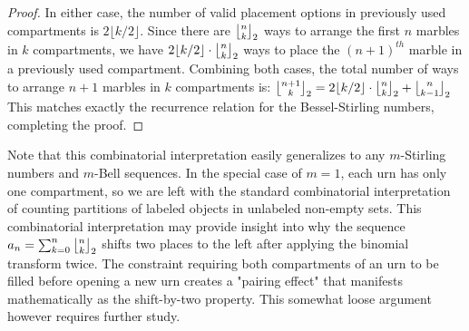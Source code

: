 \documentclass[a4paper]{amsart}
\newcommand{\mStirling}[0]{\genfrac{\lfloor}{\rfloor}{0pt}{}}
\begin{document}
\begin{proof}
In either case, the number of valid placement options in previously used compartments is $2\lfloor k/2 \rfloor$. Since there are $\mStirling{n}{k}_2$ ways to arrange the first $n$ marbles in $k$ compartments, we have $2\lfloor k/2 \rfloor \cdot \mStirling{n}{k}_2$ ways to place the $(n+1)^{th}$ marble in a previously used compartment.
Combining both cases, the total number of ways to arrange $n+1$ marbles in $k$ compartments is:
$\mStirling{n+1}{k}_2 = 2\lfloor k/2 \rfloor \cdot \mStirling{n}{k}_2 + \mStirling{n}{k-1}_2$
This matches exactly the recurrence relation for the Bessel-Stirling numbers, completing the proof.
\end{proof}

Note that this combinatorial interpretation easily generalizes to any $m$-Stirling numbers and $m$-Bell sequences. In the special case of $m=1$, each urn has only one compartment, so we are left with the standard combinatorial interpretation of counting partitions of labeled objects in unlabeled non-empty sets. This combinatorial interpretation may provide insight into why the sequence $a_n = \sum_{k=0}^n \mStirling{n}{k}_2$ shifts two places to the left after applying the binomial transform twice. The constraint requiring both compartments of an urn to be filled before opening a new urn creates a "pairing effect" that manifests mathematically as the shift-by-two property. This somewhat loose argument however requires further study.
\end{document}
